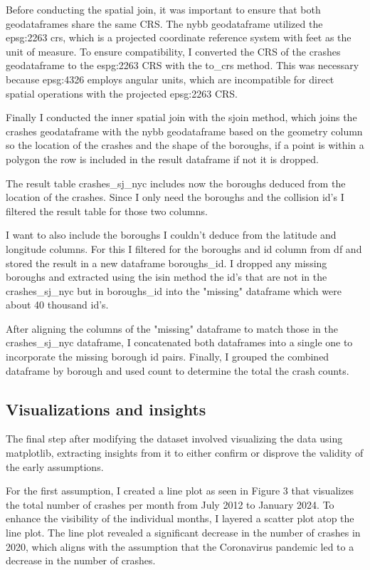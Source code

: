 \documentclass[runningheads]{llncs}
\begin{document}
Before conducting the spatial join, it was important to ensure that both geodataframes share the same CRS.
The nybb geodataframe utilized the epsg:2263 crs, which is a projected coordinate reference system with feet as the unit of measure.
To ensure compatibility, I converted the CRS of the crashes geodataframe to the espg:2263 CRS with the to\_crs method.
This was necessary because epsg:4326 employs angular units, which are incompatible for direct spatial operations with the projected epsg:2263 CRS.

Finally I conducted the inner spatial join with the sjoin method, which joins the crashes geodataframe with the nybb geodataframe 
based on the geometry column so the location of the crashes and the shape of the boroughs, if a point is within a polygon the row 
is included in the result dataframe if not it is dropped.

The result table crashes\_sj\_nyc includes now the boroughs deduced from the location of the crashes.
Since I only need the boroughs and the collision id's I filtered the result table for those two columns.

I want to also include the boroughs I couldn't deduce from the latitude and longitude columns.
For this I filtered for the boroughs and id column from df and stored the result in a new dataframe boroughs\_id.
I dropped any missing boroughs and extracted using the isin method the id's that are not in the crashes\_sj\_nyc but in boroughs\_id into 
the "missing" dataframe which were about 40 thousand id's.

After aligning the columns of the "missing" dataframe to match those 
in the crashes\_sj\_nyc dataframe, I concatenated both dataframes into a single one to incorporate the missing borough id pairs. 
Finally, I grouped the combined dataframe by borough and used count to determine the total the crash counts.

\subsection{Visualizations and insights}

The final step after modifying the dataset involved visualizing the data using matplotlib, extracting insights from it to either
confirm or disprove the validity of the early assumptions.

For the first assumption, I created a line plot as seen in Figure 3 that visualizes the total number of crashes per month from July 2012 to January 2024.
To enhance the visibility of the individual months, I layered a scatter plot atop the line plot.
The line plot revealed a significant decrease in the number of crashes in 2020, which aligns with the assumption 
that the Coronavirus pandemic led to a decrease in the number of crashes.
\end{document}
